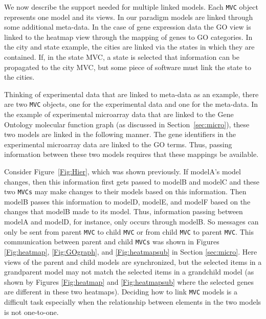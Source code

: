 \documentclass[11pt]{article}
\newcommand{\Robject}[1]{{\texttt{#1}}}
\begin{document}

We now describe the support needed for multiple linked models.
Each \Robject{MVC} object represents one model and its views.  In our
paradigm models are linked through some additional meta-data. In
the case of gene expression data the GO view is linked to the heatmap
view through the mapping of genes to GO categories. In the city and
state example, the cities are linked via the states in which they are
contained. If, in the state MVC, a state is selected that information
can be propagated to the city MVC, but some piece of software must
link the state to the cities. %

Thinking of experimental data that are linked to meta-data as an
example, there are two \Robject{MVC} objects, one for the experimental
data and one for the meta-data.  In the example of experimental
microarray data that are linked to the Gene Ontology molecular
function graph (as discussed in Section~\ref{sec:micro}), these two models 
are linked in the following manner. The gene identifiers in the
experimental microarray data are linked to the GO terms.  Thus,
passing information between these two models requires that these
mappings be available.

Consider Figure~\ref{Fig:Hier}, which was shown previously.  If
modelA's model changes, then this information first gets passed to
modelB and modelC and these two \Robject{MVCs} may make changes to
their models based on this information.  Then modelB passes this
information to modelD, modelE, and modelF based on the changes
that modelB made to its model.  Thus, information passing between
modelA and modelD, for instance, only occurs through modelB.  So
messages can only be sent from parent \Robject{MVC} to child
\Robject{MVC} or from child \Robject{MVC} to parent \Robject{MVC}.
This communication between parent and child \Robject{MVCs} was shown in Figures
\ref{Fig:heatmap}, \ref{Fig:GOgraph}, and \ref{Fig:heatmapsub} in Section
\ref{sec:micro}.  Here views of the parent and child models are
synchronized, but the selected items in a grandparent model may not
match the selected items in a grandchild model (as shown by Figures
\ref{Fig:heatmap} and \ref{Fig:heatmapsub} where the selected genes are
different in these two heatmaps).  Deciding how to link \Robject{MVC} models 
is a difficult task especially when the relationship between elements in the 
two models is not one-to-one.
\end{document}
